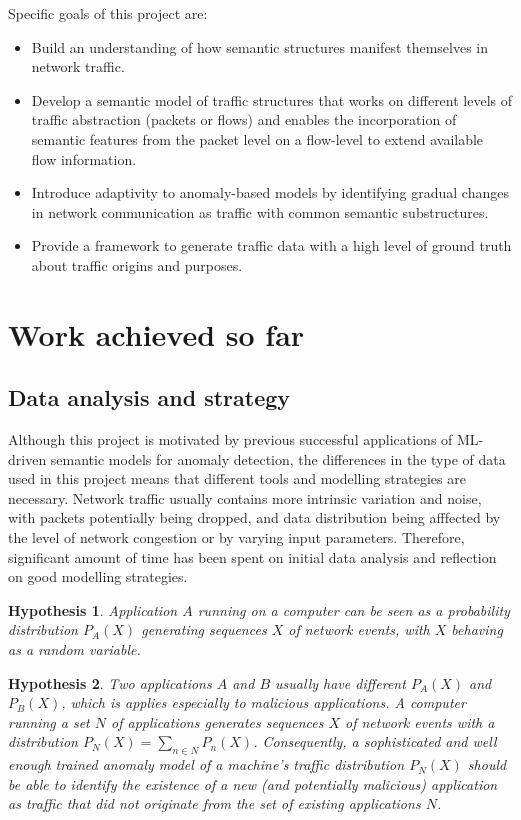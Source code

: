 \documentclass[a4paper,12pt,twoside]{report}
\newtheorem{hypothesis}{Hypothesis}
\begin{document}
Specific goals of this project are:
\begin{itemize}
\item Build an understanding of how semantic structures manifest themselves in network traffic.
\item Develop a semantic model of traffic structures that works on different levels of traffic abstraction (packets or flows) and enables the incorporation of semantic features from the packet level on a flow-level to extend available flow information.
\item Introduce adaptivity to anomaly-based models by identifying gradual changes in network communication as traffic with common semantic substructures.
\item Provide a framework to generate traffic data with a high level of ground truth about traffic origins and purposes.
\end{itemize}



\section{Work achieved so far}


\subsection{Data analysis and strategy}

Although this project is motivated by previous successful applications of ML-driven semantic models for anomaly detection, the differences in the type of data used in this project means that different tools and modelling strategies are necessary. Network traffic usually contains more intrinsic variation and noise, with packets potentially being dropped, and data distribution being afffected by the level of network congestion or by varying input parameters. Therefore, significant amount of time has been spent on initial data analysis and reflection on good modelling strategies. 


\begin{hypothesis}\label{Ass1}
Application $A$ running on a computer can be seen as a probability distribution $P_A(X)$ generating sequences $X$ of network events, with $X$ behaving as a random variable.
\end{hypothesis}

\begin{hypothesis}\label{Ass2}
Two applications $A$ and $B$ usually have different $P_A(X)$ and $P_B(X)$, which is applies especially to malicious applications. A computer running a set $N$ of applications %
generates sequences $X$ of network events with a distribution $P_N(X)=\sum_{n\in N}P_n(X)$. Consequently, a sophisticated and well enough trained anomaly model of a machine's traffic distribution $P_N(X)$ should be able to identify the existence of a new (and potentially malicious) application as traffic that did not originate from the set of existing applications $N$.
\end{hypothesis}
\end{document}
